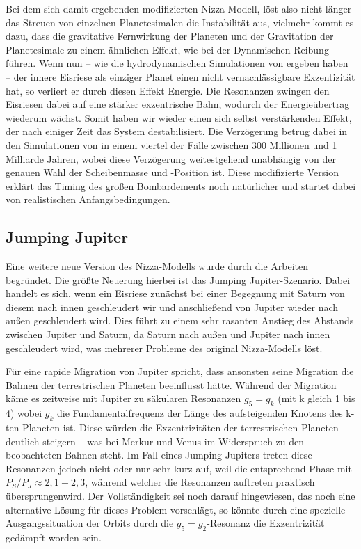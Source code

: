 \documentclass[12pt,a4paper,twoside]{article}
\renewcommand{\cite}{\citep}
\begin{document}
Bei dem sich damit ergebenden modifizierten Nizza-Modell, löst also nicht länger das Streuen von einzelnen Planetesimalen die Instabilität aus, vielmehr kommt es dazu, dass die gravitative Fernwirkung der Planeten und der Gravitation der Planetesimale zu einem ähnlichen Effekt, wie bei der Dynamischen Reibung führen.
Wenn nun -- wie die hydrodynamischen Simulationen von \cite{Morbidelli2007b} ergeben haben -- der innere Eisriese als einziger Planet einen nicht vernachlässigbare Exzentizität hat, so verliert er durch diesen Effekt Energie. Die Resonanzen zwingen den Eisriesen dabei auf eine stärker exzentrische Bahn, wodurch der Energieübertrag wiederum wächst.
Somit haben wir wieder einen sich selbst verstärkenden Effekt, der nach einiger Zeit das System destabilisiert. Die Verzögerung betrug dabei in den Simulationen von \cite{Levison2011} in einem viertel der Fälle zwischen 300 Millionen und 1 Milliarde Jahren, wobei diese Verzögerung weitestgehend unabhängig von der genauen Wahl der Scheibenmasse und -Position ist.
Diese modifizierte Version erklärt das Timing des großen Bombardements noch natürlicher und startet dabei von realistischen Anfangsbedingungen.

\subsection{Jumping Jupiter}\label{jumpingjupiter}
Eine weitere neue Version des Nizza-Modells wurde durch die Arbeiten \cite{Morbidelli2009,Brasser2009,Morbidelli2010} begründet. Die größte Neuerung hierbei ist das \glqq Jumping Jupiter-Szenario\grqq.
Dabei handelt es sich, wenn ein Eisriese zunächst bei einer Begegnung mit Saturn von diesem nach innen geschleudert wir und anschließend von Jupiter wieder nach außen geschleudert wird.
Dies führt zu einem sehr rasanten Anstieg des Abstands zwischen Jupiter und Saturn, da Saturn nach außen und Jupiter nach innen geschleudert wird, was mehrerer Probleme des original Nizza-Modells löst.

Für eine rapide Migration von Jupiter spricht, dass ansonsten seine Migration die Bahnen der terrestrischen Planeten beeinflusst hätte\cite{Brasser2009}. Während der Migration käme es zeitweise mit Jupiter zu säkularen Resonanzen $g_5 = g_k$ (mit k gleich 1 bis 4) wobei $g_k$ die Fundamentalfrequenz der Länge des aufsteigenden Knotens des k-ten Planeten ist. Diese würden die Exzentrizitäten der terrestrischen Planeten deutlich steigern – was bei Merkur und Venus im Widerspruch zu den beobachteten Bahnen steht. Im Fall eines Jumping Jupiters treten diese Resonanzen jedoch nicht oder nur sehr kurz auf, weil die entsprechend Phase mit $P_S/P_J\approx2,1-2,3$, während welcher die Resonanzen auftreten praktisch \glqq übersprungen\grqq wird\cite{Brasser2009}.
Der Vollständigkeit sei noch darauf hingewiesen, das \cite{Brasser2009} noch eine alternative Lösung für dieses Problem vorschlägt, so könnte durch eine spezielle Ausgangssituation der Orbits durch die $g_5=g_2$-Resonanz die Exzentrizität gedämpft worden sein.
\end{document}
